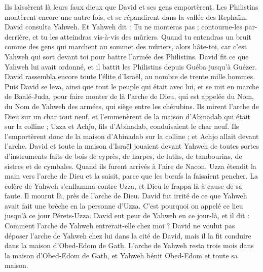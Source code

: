 \begin{multicols}{2}
Ils laissèrent là leurs faux dieux que David et ses gens emportèrent.
Les Philistins montèrent encore une autre fois, et se répandirent dans la vallée des Rephaïm.
David consulta Yahweh. Et Yahweh dit : Tu ne monteras pas ; contourne-les par-derrière, et tu les atteindras vis-à-vis des mûriers.
Quand tu entendras un bruit comme des gens qui marchent au sommet des mûriers, alors hâte-toi, car c’est Yahweh qui sort devant toi pour battre l’armée des Philistins.
David fit ce que Yahweh lui avait ordonné, et il battit les Philistins depuis Guéba jusqu'à Guézer.
\VerseOne{}David rassembla encore toute l'élite d'Israël, au nombre de trente mille hommes.
Puis David se leva, ainsi que tout le peuple qui était avec lui, et se mit en marche de Baalé-Juda, pour faire monter de là l'arche de Dieu, qui est appelée du Nom, du Nom de Yahweh des armées, qui siège entre les chérubins.
Ils mirent l'arche de Dieu sur un char tout neuf, et l'emmenèrent de la maison d'Abinadab qui était sur la colline ; Uzza et Achjo, fils d'Abinadab, conduisaient le char neuf.
Ils l’emportèrent donc de la maison d'Abinadab sur la colline ; et Achjo allait devant l'arche.
David et toute la maison d'Israël jouaient devant Yahweh de toutes sortes d'instruments faits de bois de cyprès, de harpes, de luths, de tambourins, de sistres et de cymbales.
Quand ils furent arrivés à l'aire de Nacon, Uzza étendit la main vers l'arche de Dieu et la saisit, parce que les bœufs la faisaient pencher.
La colère de Yahweh s'enflamma contre Uzza, et Dieu le frappa là à cause de sa faute. Il mourut là, près de l'arche de Dieu.
David fut irrité de ce que Yahweh avait fait une brèche en la personne d’Uzza. C’est pourquoi on appelé ce lieu jusqu'à ce jour Pérets-Uzza.
David eut peur de Yahweh en ce jour-là, et il dit : Comment l'arche de Yahweh entrerait-elle chez moi ?
David ne voulut pas déposer l'arche de Yahweh chez lui dans la cité de David, mais il la fit conduire dans la maison d'Obed-Edom de Gath.
L'arche de Yahweh resta trois mois dans la maison d'Obed-Edom de Gath, et Yahweh bénit Obed-Edom et toute sa maison.

\end{multicols}
